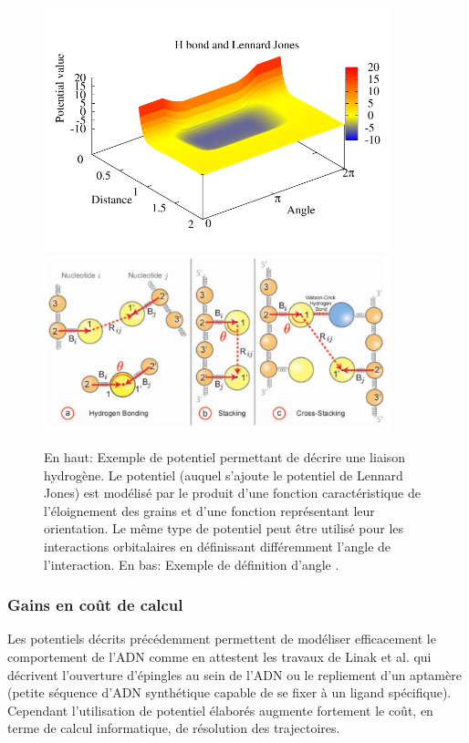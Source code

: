 \begin{figure}[H]
\begin{center}
\includegraphics[width=0.9\textwidth]{bbhbonds.pdf}
\includegraphics[width=0.9\textwidth]{specinterac.jpg}

\caption[Potentiels d'interaction spécifiques]{En haut: Exemple de potentiel permettant de décrire une liaison hydrogène. Le potentiel (auquel s'ajoute le potentiel de Lennard Jones) est modélisé par le produit d'une fonction caractéristique de l'éloignement des grains et d'une fonction représentant leur orientation. Le même type de potentiel peut être utilisé pour les interactions orbitalaires en définissant différemment l'angle de l'interaction. En bas: Exemple de définition d'angle \cite{jchem}.}
\label{hbonds}
\end{center}
\end{figure}

\subsubsection{Gains en coût de calcul}

Les potentiels décrits précédemment permettent de modéliser efficacement le comportement de l'ADN comme en attestent les travaux de Linak et al. \cite{jchem} qui décrivent l'ouverture d'épingles au sein de l'ADN ou le repliement d'un aptamère (petite séquence d'ADN synthétique capable de se fixer à un ligand spécifique). Cependant l'utilisation de potentiel élaborés augmente fortement le coût, en terme de calcul informatique, de résolution des trajectoires.

